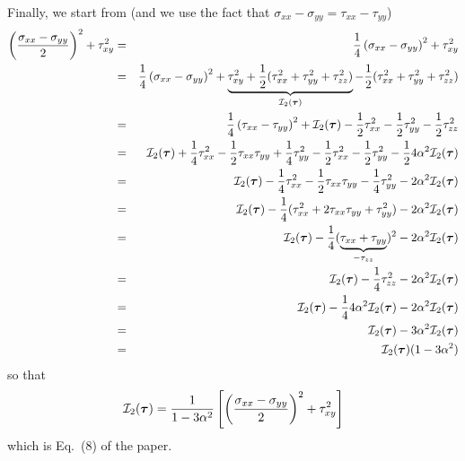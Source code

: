 Finally, we start from (and we use the fact that $\sigma_{xx}-\sigma_{yy}=\tau_{xx}-\tau_{yy}$)
\begin{eqnarray}
\left(\frac{\sigma_{xx}-\sigma_{yy}}{2} \right)^2 + \tau_{xy}^2
&=& \frac14 \left(\sigma_{xx}-\sigma_{yy} \right)^2 + \tau_{xy}^2 \nonumber\\
&=& \frac14 \left(\sigma_{xx}-\sigma_{yy} \right)^2 
+ \underbrace{\tau_{xy}^2 
+ \frac12 (\tau_{xx}^2+\tau_{yy}^2+\tau_{zz}^2)}_{{\cal I}_2(\bm\tau)}
- \frac12 (\tau_{xx}^2+\tau_{yy}^2+\tau_{zz}^2) \nonumber\\
&=& \frac14 \left(\tau_{xx}-\tau_{yy} \right)^2 
+ {\cal I}_2(\bm\tau)
- \frac12 \tau_{xx}^2 -\frac12 \tau_{yy}^2 -\frac12 \tau_{zz}^2 \nonumber\\
&=& {\cal I}_2(\bm\tau) +\frac14\tau_{xx}^2 -\frac12\tau_{xx}\tau_{yy} +\frac14\tau_{yy}^2
- \frac12 \tau_{xx}^2 -\frac12\tau_{yy}^2 -\frac12 4\alpha^2 {\cal I}_2(\bm\tau) \nonumber\\
&=& {\cal I}_2(\bm\tau) -\frac14\tau_{xx}^2 -\frac12\tau_{xx}\tau_{yy} -\frac14\tau_{yy}^2
-2\alpha^2 {\cal I}_2(\bm\tau) \nonumber\\
&=& {\cal I}_2(\bm\tau) -\frac14(\tau_{xx}^2 +2\tau_{xx}\tau_{yy} +\tau_{yy}^2)
-2\alpha^2 {\cal I}_2(\bm\tau) \nonumber\\
&=& {\cal I}_2(\bm\tau) -\frac14(\underbrace{\tau_{xx}+\tau_{yy}}_{-\tau_{zz}})^2
-2\alpha^2 {\cal I}_2(\bm\tau) \nonumber\\
&=& {\cal I}_2(\bm\tau) -\frac14 \tau_{zz}^2 -2\alpha^2 {\cal I}_2(\bm\tau) \nonumber\\
&=& {\cal I}_2(\bm\tau) -\frac14 4\alpha^2 {\cal I}_2(\bm\tau) -2\alpha^2 {\cal I}_2(\bm\tau) \nonumber\\
&=& {\cal I}_2(\bm\tau) -3\alpha^2 {\cal I}_2(\bm\tau) \nonumber\\
&=& {\cal I}_2(\bm\tau)(1 -3\alpha^2)
\end{eqnarray}
so that 
\begin{equation}
{\cal I}_2(\bm\tau) = \frac{1}{1 -3\alpha^2} \left[\left(\frac{\sigma_{xx}-\sigma_{yy}}{2} \right)^2 + \tau_{xy}^2 \right]
\label{eq:dp52:cd}
\end{equation}
which is Eq.~(8) of the paper.

